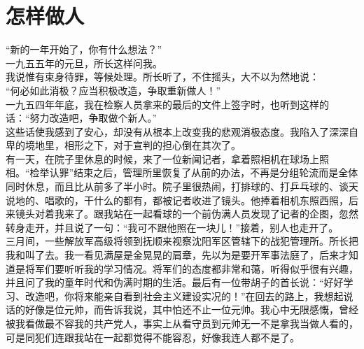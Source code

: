 \fancyhead[RO]{} %
\fancyhead[LE]{} %
\chapter*{怎样做人}
\thispagestyle{empty}
“新的一年开始了，你有什么想法？”\\

一九五五年的元旦，所长这样问我。\\

我说惟有束身待罪，等候处理。所长听了，不住摇头，大不以为然地说：\\

“何必如此消极？应当积极改造，争取重新做人！”\\

一九五四年年底，我在检察人员拿来的最后的文件上签字时，也听到这样的话：“努力改造吧，争取做个新人。”\\

这些话使我感到了安心，却没有从根本上改变我的悲观消极态度。我陷入了深深自卑的境地里，相形之下，对于宣判的担心倒在其次了。\\

有一天，在院子里休息的时候，来了一位新闻记者，拿着照相机在球场上照相。“检举认罪”结束之后，管理所里恢复了从前的办法，不再是分组轮流而是全体同时休息，而且比从前多了半小时。院子里很热闹，打排球的、打乒乓球的、谈天说地的、唱歌的，干什么的都有，都被记者收进了镜头。他捧着相机东照西照，后来镜头对着我来了。跟我站在一起看球的一个前伪满人员发现了记者的企图，忽然转身走开，并且说了一句：“我可不跟他照在一块儿！”接着，别人也走开了。\\

三月间，一些解放军高级将领到抚顺来视察沈阳军区管辖下的战犯管理所。所长把我和叫了去。我一看见满屋是金晃晃的肩章，先以为是要开军事法庭了，后来才知道是将军们要听听我的学习情况。将军们的态度都非常和蔼，听得似乎很有兴趣，并且问了我的童年时代和伪满时期的生活。最后有一位带胡子的首长说：“好好学习、改造吧，你将来能亲自看到社会主义建设实况的！”在回去的路上，我想起说话的好像是位元帅，而告诉我说，其中怕还不止一位元帅。我心中无限感慨，曾经被我看做最不容我的共产党人，事实上从看守员到元帅无一不是拿我当做人看的，可是同犯们连跟我站在一起都觉得不能容忍，好像我连人都不是了。\\

